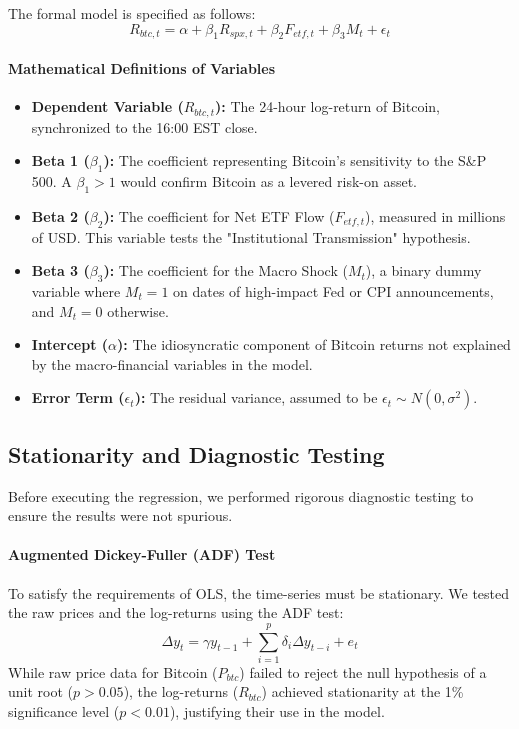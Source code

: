 \documentclass[10pt, conference, compsocconf]{IEEEtran}
\begin{document}
The formal model is specified as follows:
\begin{equation}
R_{btc,t} = \alpha + \beta_1 R_{spx,t} + \beta_2 F_{etf,t} + \beta_3 M_t + \epsilon_t \label{eq:ols}
\end{equation}

\paragraph{Mathematical Definitions of Variables}
\begin{itemize}
    \item \textbf{Dependent Variable ($R_{btc,t}$):} The 24-hour log-return of Bitcoin, synchronized to the 16:00 EST close.
    \item \textbf{Beta 1 ($\beta_1$):} The coefficient representing Bitcoin's sensitivity to the S\&P 500. A $\beta_1 > 1$ would confirm Bitcoin as a levered risk-on asset.
    \item \textbf{Beta 2 ($\beta_2$):} The coefficient for Net ETF Flow ($F_{etf,t}$), measured in millions of USD. This variable tests the "Institutional Transmission" hypothesis.
    \item \textbf{Beta 3 ($\beta_3$):} The coefficient for the Macro Shock ($M_t$), a binary dummy variable where $M_t = 1$ on dates of high-impact Fed or CPI announcements, and $M_t = 0$ otherwise.
    \item \textbf{Intercept ($\alpha$):} The idiosyncratic component of Bitcoin returns not explained by the macro-financial variables in the model.
    \item \textbf{Error Term ($\epsilon_t$):} The residual variance, assumed to be $\epsilon_t \sim N(0, \sigma^2)$.
\end{itemize}


\subsection{Stationarity and Diagnostic Testing}

Before executing the regression, we performed rigorous diagnostic testing to ensure the results were not spurious.

\paragraph{Augmented Dickey-Fuller (ADF) Test}
To satisfy the requirements of OLS, the time-series must be stationary. We tested the raw prices and the log-returns using the ADF test:
\begin{equation}
\Delta y_t = \gamma y_{t-1} + \sum_{i=1}^{p} \delta_i \Delta y_{t-i} + e_t \label{eq:adf}
\end{equation}
While raw price data for Bitcoin ($P_{btc}$) failed to reject the null hypothesis of a unit root ($p > 0.05$), the log-returns ($R_{btc}$) achieved stationarity at the 1\% significance level ($p < 0.01$), justifying their use in the model.
\end{document}
